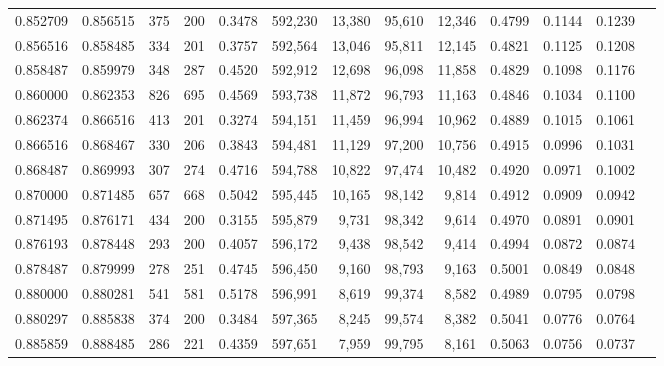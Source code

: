 \begin{tabular}{rrrrrrrrrrrrr}
0.852709 & 0.856515 &   375 & 200 &                                     0.3478 & 592,230 &  13,380 &  95,610 &  12,346 & 0.4799 & 0.1144 & 0.1239 \\
0.856516 & 0.858485 &   334 & 201 &                                     0.3757 & 592,564 &  13,046 &  95,811 &  12,145 & 0.4821 & 0.1125 & 0.1208 \\
0.858487 & 0.859979 &   348 & 287 &                                     0.4520 & 592,912 &  12,698 &  96,098 &  11,858 & 0.4829 & 0.1098 & 0.1176 \\
0.860000 & 0.862353 &   826 & 695 &                                     0.4569 & 593,738 &  11,872 &  96,793 &  11,163 & 0.4846 & 0.1034 & 0.1100 \\
0.862374 & 0.866516 &   413 & 201 &                                     0.3274 & 594,151 &  11,459 &  96,994 &  10,962 & 0.4889 & 0.1015 & 0.1061 \\
0.866516 & 0.868467 &   330 & 206 &                                     0.3843 & 594,481 &  11,129 &  97,200 &  10,756 & 0.4915 & 0.0996 & 0.1031 \\
0.868487 & 0.869993 &   307 & 274 &                                     0.4716 & 594,788 &  10,822 &  97,474 &  10,482 & 0.4920 & 0.0971 & 0.1002 \\
0.870000 & 0.871485 &   657 & 668 &                                     0.5042 & 595,445 &  10,165 &  98,142 &   9,814 & 0.4912 & 0.0909 & 0.0942 \\
0.871495 & 0.876171 &   434 & 200 &                                     0.3155 & 595,879 &   9,731 &  98,342 &   9,614 & 0.4970 & 0.0891 & 0.0901 \\
0.876193 & 0.878448 &   293 & 200 &                                     0.4057 & 596,172 &   9,438 &  98,542 &   9,414 & 0.4994 & 0.0872 & 0.0874 \\
0.878487 & 0.879999 &   278 & 251 &                                     0.4745 & 596,450 &   9,160 &  98,793 &   9,163 & 0.5001 & 0.0849 & 0.0848 \\
0.880000 & 0.880281 &   541 & 581 &                                     0.5178 & 596,991 &   8,619 &  99,374 &   8,582 & 0.4989 & 0.0795 & 0.0798 \\
0.880297 & 0.885838 &   374 & 200 &                                     0.3484 & 597,365 &   8,245 &  99,574 &   8,382 & 0.5041 & 0.0776 & 0.0764 \\
0.885859 & 0.888485 &   286 & 221 &                                     0.4359 & 597,651 &   7,959 &  99,795 &   8,161 & 0.5063 & 0.0756 & 0.0737 \\

\end{tabular}
